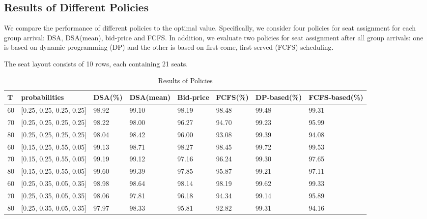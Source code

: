 \subsection{Results of Different Policies}

We compare the performance of different policies to the optimal value. Specifically, we consider four policies for seat assignment for each group arrival: DSA, DSA(mean), bid-price and FCFS. In addition, we evaluate two policies for seat assignment after all group arrivals: one is based on dynamic programming (DP) and the other is based on first-come, first-served (FCFS) scheduling.

The seat layout consists of 10 rows, each containing 21 seats.

\begin{table}[ht]
  \centering
  \caption{Results of Policies}
  \begin{tabular}{|l|l|l|l|l|l|l|l|}
  \hline
   T & probabilities &  DSA(\%) & DSA(mean) & Bid-price & FCFS(\%) & DP-based(\%) & FCFS-based(\%) \\
  \hline
   60  & [0.25, 0.25, 0.25, 0.25]  & 98.92 & 99.10 & 98.19 & 98.48 & 99.48 & 99.31 \\
   70  & [0.25, 0.25, 0.25, 0.25]  & 98.22 & 98.00 & 96.27 & 94.70 & 99.23 & 95.99 \\
   80  & [0.25, 0.25, 0.25, 0.25]  & 98.04 & 98.42 & 96.00 & 93.08 & 99.39 & 94.08 \\
   \hline
   60  & [0.15, 0.25, 0.55, 0.05]  & 99.13 & 98.71 & 98.27 & 98.45 & 99.72 & 99.53 \\
   70  & [0.15, 0.25, 0.55, 0.05]  & 99.19 & 99.12 & 97.16 & 96.24 & 99.30 & 97.65 \\
   80  & [0.15, 0.25, 0.55, 0.05]  & 99.60 & 99.39 & 97.85 & 95.87 & 99.21 & 97.11 \\
   \hline
   60  & [0.25, 0.35, 0.05, 0.35]  & 98.98 & 98.64 & 98.14 & 98.19 & 99.62 & 99.33 \\
   70  & [0.25, 0.35, 0.05, 0.35]  & 98.06 & 97.81 & 96.18 & 94.34 & 99.14 & 95.89 \\
   80  & [0.25, 0.35, 0.05, 0.35]  & 97.97 & 98.33 & 95.81 & 92.82 & 99.31 & 94.16 \\
  \hline
  \end{tabular}
\end{table}

